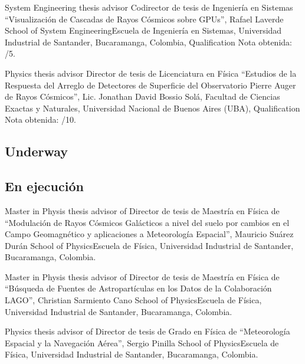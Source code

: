 \ifeng
System Engineering thesis advisor
 \else
Codirector de tesis de Ingeniería en Sistemas
 \fi
``Visualización de Cascadas de Rayos Cósmicos sobre GPUs'', Rafael Laverde \at \ifeng School of System Engineering\else Escuela de Ingeniería en Sistemas\fi, Universidad Industrial de Santander, Bucaramanga, Colombia, \ifeng Qualification \else Nota obtenida: /5.

\ifeng
Physics thesis advisor
 \else
Director de tesis de Licenciatura en Física
 \fi
``Estudios de la Respuesta del Arreglo de Detectores de Superficie del Observatorio Pierre Auger de Rayos Cósmicos'', Lic. Jonathan David Bossio Solá, \at Facultad de Ciencias Exactas y Naturales, Universidad Nacional de Buenos Aires (UBA), \ifeng Qualification \else Nota obtenida: /10.

\ifeng
\subsection*{Underway}
\else
\subsection*{En ejecución}
\fi

\ifeng
Master in Physis thesis advisor of
 \else
Director de tesis de Maestría en Física de
 \fi
``Modulación de Rayos Cósmicos Galácticos a nivel del suelo por cambios en el Campo Geomagnético y aplicaciones a Meteorología Espacial'', Mauricio Suárez Durán \at \ifeng School of Physics\else Escuela de Física\fi, Universidad Industrial de Santander, Bucaramanga, Colombia. %

\ifeng
Master in Physis thesis advisor of
 \else
Director de tesis de Maestría en Física de
 \fi
``Búsqueda de Fuentes de Astropartículas en los Datos de la Colaboración LAGO'', Christian Sarmiento Cano \at \ifeng School of Physics\else Escuela de Física\fi, Universidad Industrial de Santander, Bucaramanga, Colombia.

\ifeng
Physics thesis advisor of
 \else
Director de tesis de Grado en Física de
 \fi
``Meteorología Espacial y la Navegación Aérea'', Sergio Pinilla \at \ifeng School of Physics\else Escuela de Física\fi, Universidad Industrial de Santander, Bucaramanga, Colombia.
